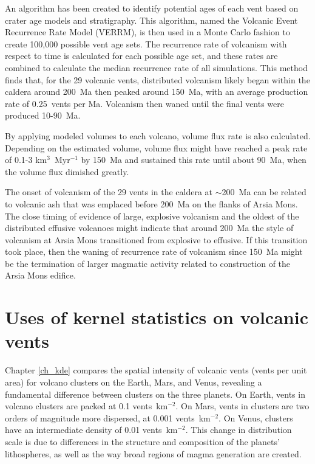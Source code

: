 An algorithm has been created to identify potential ages of each vent based on crater age models and stratigraphy. This algorithm, named the Volcanic Event Recurrence Rate Model (VERRM), is then used in a Monte Carlo fashion to create 100,000 possible vent age sets. The recurrence rate of volcanism with respect to time is calculated for each possible age set, and these rates are combined to calculate the median recurrence rate of all simulations. This method finds that, for the 29 volcanic vents, distributed volcanism likely began within the caldera around 200~Ma then peaked around 150~Ma, with an average production rate of 0.25~vents per Ma. Volcanism then waned until the final vents were produced 10-90~Ma.

By applying modeled volumes to each volcano, volume flux rate is also calculated. Depending on the estimated volume, volume flux might have reached a peak rate of 0.1-3 km$^3$~Myr$^{-1}$ by 150~Ma and sustained this rate until about 90~Ma, when the volume flux dimished greatly.

The onset of volcanism of the 29 vents in the caldera at $\sim$200~Ma can be related to volcanic ash that was emplaced before 200~Ma on the flanks of Arsia Mons. The close timing of evidence of large, explosive volcanism and the oldest of the distributed effusive volcanoes might indicate that around 200~Ma the style of volcanism at Arsia Mons transitioned from explosive to effusive. If this transition took place, then the waning of recurrence rate of volcanism since 150~Ma might be the termination of larger magmatic activity related to construction of the Arsia Mons edifice.


\section{Uses of kernel statistics on volcanic vents}
Chapter \ref{ch_kde} compares the spatial intensity of volcanic vents (vents per unit area) for volcano clusters on the Earth, Mars, and Venus, revealing a fundamental difference between clusters on the three planets. On Earth, vents in volcano clusters are packed at 0.1 vents~km$^{-2}$. On Mars, vents in clusters are two orders of magnitude more dispersed, at 0.001 vents~km$^{-2}$. On Venus, clusters have an intermediate density of 0.01 vents~km$^{-2}$. This change in distribution scale is due to differences in the structure and composition of the planets' lithospheres, as well as the way broad regions of magma generation are created.

